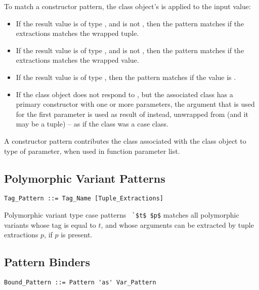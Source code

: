 To match a constructor pattern, the class object's  is applied to the input value:
\begin{itemize}
  \item If the result value is of type , and is not , then the pattern matches if the extractions matches the wrapped tuple. 
  \item If the result value is of type , and is not , then the pattern matches if the extractions matches the wrapped value. 
  \item If the result value is of type , then the pattern matches if the value is . 
  \item If the class object does not respond to , but the associated class has a primary constructor with one or more parameters, the argument that is used for the first parameter is used as result of  instead, unwrapped from  (and it may be a tuple) -- as if the class was a case class. 
\end{itemize} 

A constructor pattern contributes the class associated with the class object to type of parameter, when used in function parameter list. 





\subsection{Polymorphic Variant Patterns}
\label{sec:polymorphic-variant-patterns}

\grammar\begin{lstlisting}
Tag_Pattern ::= Tag_Name [Tuple_Extractions]
\end{lstlisting}

Polymorphic variant type case patterns ~\lstinline!`$t$ $p$! matches all polymorphic variants whose tag is equal to $t$, and whose arguments can be extracted by tuple extractions $p$, if $p$ is present. 





\subsection{Pattern Binders}
\label{sec:pattern-binders}

\grammar\begin{lstlisting}
Bound_Pattern ::= Pattern 'as' Var_Pattern
\end{lstlisting}

